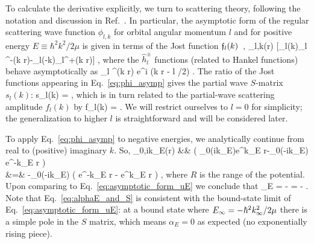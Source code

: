 	To calculate the derivative explicitly, we turn to scattering theory,
	following the notation and discussion in
	Ref.~\cite{taylor2006scattering}.  In particular, the asymptotic form
	of the regular scattering wave function $\phi_{l,k}$ for orbital
	angular momentum $l$ and for positive energy $E \equiv \hbar^2 k^2/2\mu$
	is given in terms of the Jost function
	$\mathfrak{f}_l(k)$~\cite{taylor2006scattering},
	\beq
	  \phi_{l,k}(r) \longrightarrow
	    [\Jost_l(k)_l ^{-}(k r)-\Jost_l(-k)_l^{+}(k r)]
	    \;,
	    \label{eq:phi_asymp}
	\eeq
	where the $\hat{h}_l^{\pm}$ functions (related to Hankel functions)
	behave asymptotically as
	\beq
	_l ^{\pm}(k r)
	    \longrightarrow e^{\pm i (k r - l \pi/2)}
	    \;.
	\eeq
	The ratio of the Jost functions appearing in Eq.~\eqref{eq:phi_asymp}
	gives the partial wave $S$-matrix $s_l(k)$:
	\beq
	   s_l(k) = 
	   \;,
	   \label{eq:s_l}
	\eeq
	which is in turn related to the partial-wave scattering amplitude
	$f_l(k)$ by
	\beq
	  f_l(k) = 
	  \;.
	  \label{eq:f_l}
	\eeq
	We will restrict ourselves to $l=0$ for simplicity; the generalization
	to higher $l$ is straightforward and will be considered later.

	To apply Eq.~\eqref{eq:phi_asymp} to negative energies, we
	analytically continue from real to (positive) imaginary $k$.  So,
	\bea
	   \phi_{0,ik_E}(r)
	       &\longrightarrow&
	         \bigl(
		    \Jost_0(ik_E)e^{k_E r}-\Jost_0(-ik_E) e^{-k_E r} \bigr)
		 \nonumber \\
	       &=&
	       -\Jost_0(-ik_E) \bigl(
	           e^{-k_E r} -  e^{k_E r}
	         \bigr)
	       	\;,
	  \label{eq:asymptotic_form_phiE}
	\eea
	where $R$ is the range of the potential.  Upon comparing to
	Eq.~\eqref{eq:asymptotic_form_uE} we conclude that
	\beq
	  \alpha_E = -
	   = - \;.
	  \label{eq:alphaE_and_S}
	\eeq
	Note that Eq.~\eqref{eq:alphaE_and_S} is consistent with the
	bound-state limit of Eq.~\eqref{eq:asymptotic_form_uE}: at a bound
	state where $E_{\infty} = -\hbar^2 k_{\infty}^2/2\mu$ there is a simple pole in the $S$
	matrix, which means $\alpha_E = 0$ as expected (no exponentially
	rising piece).

